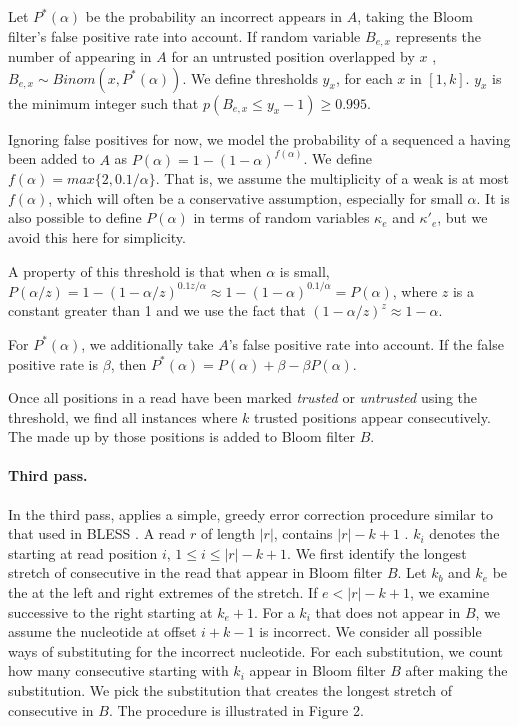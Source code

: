 \documentclass{bmcart}
\begin{document}
Let $P^*(\alpha)$ be the probability an incorrect \kmer appears in $A$, taking the Bloom filter's false positive rate into account.  If random variable $B_{e,x}$ represents the number of \kmers appearing in $A$ for an untrusted position overlapped by $x$ \kmers, $B_{e,x} \sim Binom(x,P^*(\alpha))$.  We define thresholds $y_x$, for each $x$ in $[1, k]$.  $y_x$ is the minimum integer such that $p(B_{e,x}\le y_x - 1)\ge 0.995$.

Ignoring false positives for now, we model the probability of a sequenced a \kmer having been added to $A$ as $P(\alpha)=1-(1-\alpha)^{f(\alpha)}$.  We define $f(\alpha)=max\{2,0.1/\alpha\}$.  That is, we assume the multiplicity of a weak \kmer is at most $f(\alpha)$, which will often be a conservative assumption, especially for small $\alpha$.  It is also possible to define $P(\alpha)$ in terms of random variables $\kappa_e$ and $\kappa'_e$, but we avoid this here for simplicity.

A property of this threshold is that when $\alpha$ is small, $P(\alpha/z)=1-(1-\alpha/z)^{0.1z/\alpha}\approx 1-(1-\alpha)^{0.1/\alpha}=P(\alpha)$, where $z$ is a constant greater than 1 and we use the fact that $(1-\alpha/z)^z\approx 1-\alpha$.

For $P^*(\alpha)$, we additionally take $A$'s false positive rate into account.  If the false positive rate is $\beta$, then $P^*(\alpha)=P(\alpha)+\beta-\beta P(\alpha)$.

Once all positions in a read have been marked \emph{trusted} or \emph{untrusted} using the threshold, we find all instances where $k$ trusted positions appear consecutively.  The \kmer made up by those positions is added to Bloom filter $B$.

\paragraph{Third pass.} 
In the third pass, \tool applies a simple, greedy error correction procedure similar to that used in BLESS \cite{heo2014bless}.
A read $r$ of length $|r|$, contains $|r|-k+1$ \kmers.
$k_i$ denotes the \kmer starting at read position $i$, $1\le i\le|r|-k+1$.
We first identify the longest stretch of consecutive \kmers in the read that appear in Bloom filter $B$.
Let $k_b$ and $k_e$ be the \kmers at the left and right extremes of the stretch.
If $e < |r|-k+1$, we examine successive \kmers to the right starting at $k_e+1$.
For a \kmer $k_i$ that does not appear in $B$, we assume the nucleotide at offset $i+k-1$ is incorrect.
We consider all possible ways of substituting for the incorrect nucleotide.
For each substitution, we count how many consecutive \kmers starting with $k_i$ appear in Bloom filter $B$ after making the substitution.
We pick the substitution that creates the longest stretch of consecutive \kmers in $B$. The procedure is illustrated in Figure 2.  
\end{document}
